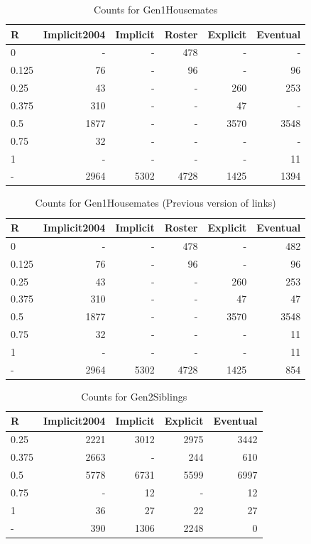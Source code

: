 \documentclass[a4paper]{article}\usepackage{graphicx, color}
\begin{document}
\begin{table}[ht]
\centering
{\large
\begin{tabular}{lrrrrr}
  \hline
R & Implicit2004 & Implicit & Roster & Explicit & Eventual \\ 
  \hline
0 & - & - & 478 & - & - \\ 
  0.125 &  76 & - &  96 & - &  96 \\ 
  0.25 &  43 & - & - & 260 & 253 \\ 
  0.375 & 310 & - & - &  47 & - \\ 
  0.5 & 1877 & - & - & 3570 & 3548 \\ 
  0.75 &  32 & - & - & - & - \\ 
  1 & - & - & - & - &  11 \\ 
  - & 2964 & 5302 & 4728 & 1425 & 1394 \\ 
   \hline
\end{tabular}
}
\caption{Counts for Gen1Housemates} 
\end{table}
\begin{table}[ht]
\centering
{\large
\begin{tabular}{lrrrrr}
  \hline
R & Implicit2004 & Implicit & Roster & Explicit & Eventual \\ 
  \hline
0 & - & - & 478 & - & 482 \\ 
  0.125 &  76 & - &  96 & - &  96 \\ 
  0.25 &  43 & - & - & 260 & 253 \\ 
  0.375 & 310 & - & - &  47 &  47 \\ 
  0.5 & 1877 & - & - & 3570 & 3548 \\ 
  0.75 &  32 & - & - & - &  11 \\ 
  1 & - & - & - & - &  11 \\ 
  - & 2964 & 5302 & 4728 & 1425 & 854 \\ 
   \hline
\end{tabular}
}
\caption{Counts for Gen1Housemates (Previous version of links)} 
\end{table}
\begin{table}[ht]
\centering
{\large
\begin{tabular}{lrrrr}
  \hline
R & Implicit2004 & Implicit & Explicit & Eventual \\ 
  \hline
0.25 & 2221 & 3012 & 2975 & 3442 \\ 
  0.375 & 2663 & - & 244 & 610 \\ 
  0.5 & 5778 & 6731 & 5599 & 6997 \\ 
  0.75 & - &  12 & - &  12 \\ 
  1 &  36 &  27 &  22 &  27 \\ 
  - & 390 & 1306 & 2248 &   0 \\ 
   \hline
\end{tabular}
}
\caption{Counts for Gen2Siblings} 
\end{table}
\end{document}
